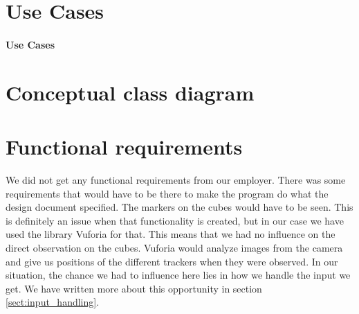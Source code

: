 \section{Use Cases}

\paragraph{Use Cases}

\section{Conceptual class diagram}

\section{Functional requirements}
We did not get any functional requirements from our employer. There was
some requirements that would have to be there to make the program do what the
design document specified. The markers on the cubes would have to be seen. This is definitely an issue when that functionality is created, but in our case we have used the library \gls{Vuforia} for that. This means that we had no influence on the direct observation on the cubes. Vuforia would analyze images from the camera and give us positions of the different trackers when they were observed. In our situation, the chance we had to influence here lies in how we handle the input we get. We have written more about this opportunity in section \ref{sect:input_handling}.

